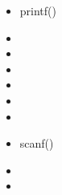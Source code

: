 \begin{itemize}
    \item printf()
    \item %
    \item %
    \item %
    \item %
    \item %
    \item %
    \item scanf()
    \item %
    \item %
    \end{itemize}